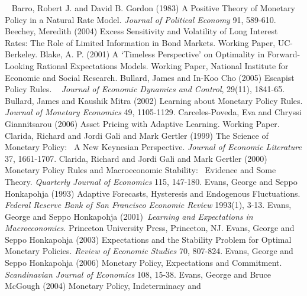 \documentclass{article}
\begin{document}
\begin{doublespace}
\ \newline
Barro, Robert J. and David B. Gordon (1983) A Positive Theory of Monetary
Policy in a Natural Rate Model. \textit{Journal of Political Economy} 91,
589-610.\bigskip \newline
Beechey, Meredith (2004) Excess Sensitivity and Volatility of Long Interest
Rates: The Role of Limited Information in Bond Markets. Working Paper,
UC-Berkeley.\bigskip \newline
Blake, A. P. (2001) A `Timeless Perspective' on Optimality in
Forward-Looking Rational Expectations Models. Working Paper, National
Institute for Economic and Social Research.\bigskip \newline
Bullard, James and In-Koo Cho (2005) Escapist Policy Rules. \ \textit{%
Journal of Economic Dynamics and Control}, 29(11), 1841-65.\bigskip \newline
Bullard, James and Kaushik Mitra (2002) Learning about Monetary Policy
Rules. \textit{Journal of Monetary Economics} 49, 1105-1129.\bigskip \newline
Carceles-Poveda, Eva and Chryssi Giannitsarou (2006) Asset Pricing with
Adaptive Learning. Working Paper.\bigskip \newline
Clarida, Richard and Jordi Gali and Mark Gertler (1999) The Science of
Monetary Policy: \ A New Keynesian Perspective. \textit{Journal of Economic
Literature} 37, 1661-1707.\bigskip \newline
Clarida, Richard and Jordi Gali and Mark Gertler (2000) Monetary Policy
Rules and Macroeconomic Stability: \ Evidence and Some Theory. \textit{%
Quarterly Journal of Economics} 115, 147-180.\bigskip \newline
Evans, George and Seppo Honkapohja (1993) Adaptive Forecasts, Hysteresis and
Endogenous Fluctuations. \textit{Federal Reserve Bank of San Francisco
Economic Review} 1993(1), 3-13.\bigskip \newline
Evans, George and Seppo Honkapohja (2001)\ \textit{Learning and Expectations
in Macroeconomics}. Princeton University Press, Princeton, NJ.\bigskip 
\newline
Evans, George and Seppo Honkapohja (2003) Expectations and the Stability
Problem for Optimal Monetary Policies. \textit{Review of Economic Studies}
70, 807-824.\bigskip \newline
Evans, George and Seppo Honkapohja (2006) Monetary Policy, Expectations and
Commitment. \textit{Scandinavian Journal of Economics} 108, 15-38.\bigskip 
\newline
Evans, George and Bruce McGough (2004) Monetary Policy, Indeterminacy and

\end{doublespace}
\end{document}
